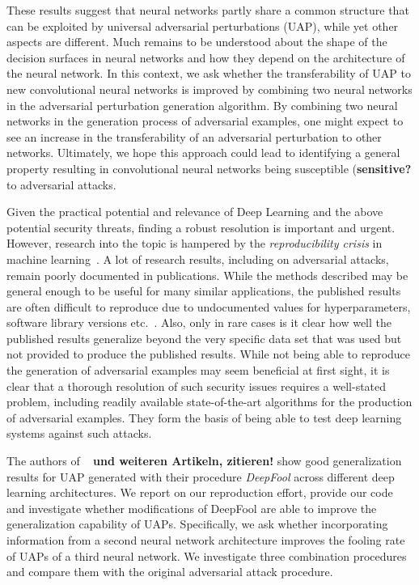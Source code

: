 \documentclass[runningheads]{llncs}
\begin{document}
These results suggest that neural networks partly share a common structure that can be exploited by universal adversarial perturbations (UAP), while yet other aspects are different. Much remains to be understood about the shape of the decision surfaces in neural networks and how they depend on the architecture of the neural network. In this context, we ask whether the transferability of UAP to new convolutional neural networks is improved by combining two neural networks in the adversarial perturbation generation algorithm. By combining two neural networks in the generation process of adversarial examples, one might expect to see an increase in the transferability of an adversarial perturbation to other networks. Ultimately, we hope this approach could lead to identifying a general property resulting in convolutional neural networks being susceptible ({\bf sensitive?} to adversarial attacks.

Given the practical potential and relevance of Deep Learning and the above potential security threats, finding a robust resolution is important and urgent. However, research into the topic is hampered by the \emph{reproducibility crisis} in machine learning~\cite{raff2020quantifying}. A lot of research results, including on adversarial attacks, remain poorly documented in publications. While the methods described may be general enough to be useful for many similar applications, 
the published results are often difficult to reproduce due to undocumented values for hyperparameters, software library versions etc.~\cite{Gundersen2018StateOT}.%
Also, only in rare cases is it clear how well the published results generalize beyond the very specific data set that was used but not provided to produce the published results. While not being able to reproduce the generation of adversarial examples may seem beneficial at first sight, it is clear that a thorough resolution of such security issues requires a well-stated problem, including readily available state-of-the-art algorithms for the production of adversarial examples. They form the basis of being able to test deep learning systems against such attacks. 

The authors of ~\cite{moosavi-dezfooli_universal_2017} {\bf und weiteren Artikeln, zitieren!} show good generalization results for UAP generated with their procedure \emph{DeepFool}\cite{DeepFool-Moosavi-Dezfooli15} across different deep learning architectures. We report on our reproduction effort, provide our code and investigate whether modifications of DeepFool are able to improve the generalization capability of UAPs. Specifically, we ask whether incorporating information from a second neural network architecture improves the fooling rate of UAPs of a third neural network. We investigate three combination procedures and compare them with the original adversarial attack procedure.
\end{document}
